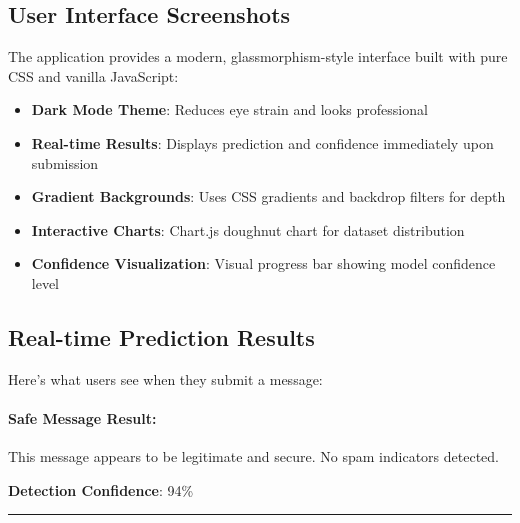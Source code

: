 \documentclass[12pt, a4paper]{article}
\begin{document}
\subsection{User Interface Screenshots}

The application provides a modern, glassmorphism-style interface built with pure CSS and vanilla JavaScript:

\begin{itemize}
    \item \textbf{Dark Mode Theme}: Reduces eye strain and looks professional
    \item \textbf{Real-time Results}: Displays prediction and confidence immediately upon submission
    \item \textbf{Gradient Backgrounds}: Uses CSS gradients and backdrop filters for depth
    \item \textbf{Interactive Charts}: Chart.js doughnut chart for dataset distribution
    \item \textbf{Confidence Visualization}: Visual progress bar showing model confidence level
\end{itemize}


\subsection{Real-time Prediction Results}

Here's what users see when they submit a message:

\paragraph{Safe Message Result:}
\begin{center}
\begin{tcolorbox}[colback=white, colframe=success, title=\textbf{✓ Safe Message}]
    This message appears to be legitimate and secure. No spam indicators detected.
    
    \textbf{Detection Confidence}: 94\%
    
    \textcolor{success}{\rule{0.75\textwidth}{5pt}}
\end{tcolorbox}
\end{center}
\end{document}
